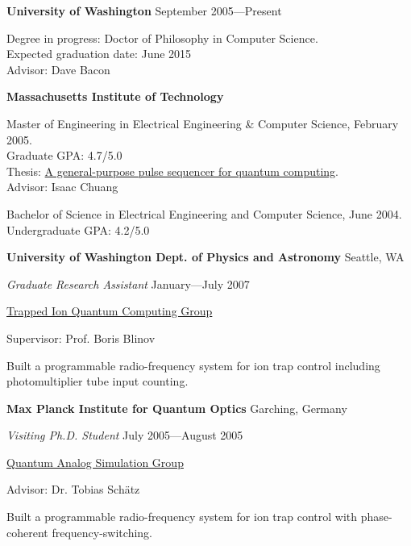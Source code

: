 \documentclass[letter]{article}
\begin{document}
{\bf University of Washington} \hspace*{\fill}September 2005---Present
\par
Degree in progress: Doctor of Philosophy in Computer Science.\\
Expected graduation date: June 2015\\
Advisor: Dave Bacon
\vspace{\baselineskip}
\par

{\bf Massachusetts Institute of Technology}
\par
Master of Engineering in Electrical Engineering \& Computer Science, February 2005.\\
Graduate GPA: 4.7/5.0\\
Thesis: \href{http://sourceforge.net/project/showfiles.php?group_id=129764&package_id=144780&release_id=307201}{A general-purpose pulse sequencer for quantum computing}.\\
Advisor: Isaac Chuang\\
\par
Bachelor of Science in Electrical Engineering and Computer Science, June 2004.\\
Undergraduate GPA: 4.2/5.0
\vspace{\baselineskip}
\par

\vspace{\baselineskip}
\par
{\bf {University of Washington Dept. of Physics and Astronomy}} \hfill Seattle, WA
\par
{\em Graduate Research Assistant} \hfill January---July 2007
\par
\href{http://depts.washington.edu/qcomp/}{Trapped Ion Quantum Computing Group}
\par
Supervisor: Prof. Boris Blinov
\par
Built a programmable radio-frequency system for ion trap control
including photomultiplier tube input counting.

\par

\vspace{\baselineskip}
\par
{\bf Max Planck Institute for Quantum Optics} \hfill Garching, Germany
\par
{\em Visiting Ph.D. Student} \hfill July 2005---August 2005
\par
\href{http://www.mpq.mpg.de/qsim/}{Quantum Analog Simulation Group}
\par
Advisor: Dr. Tobias Sch\"atz
\par
Built a programmable radio-frequency system for ion trap control
with phase-coherent frequency-switching.
\par
\end{document}
